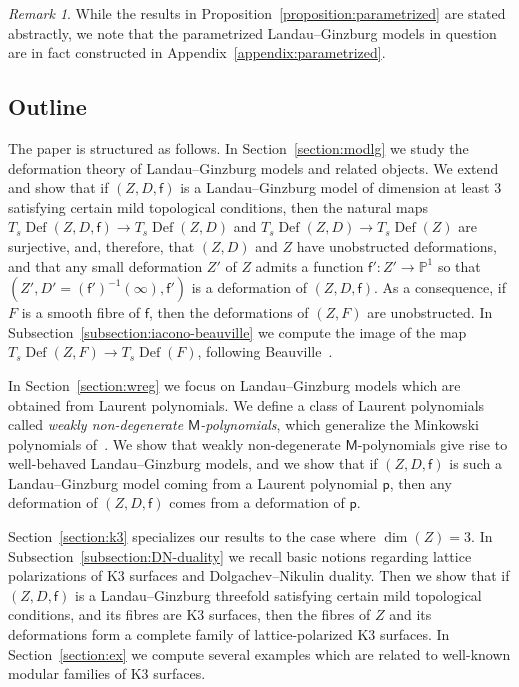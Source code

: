 \documentclass[10pt]{amsart}
\numberwithin{equation}{section}
\theoremstyle{plain}
\theoremstyle{definition}
\theoremstyle{remark}
\newtheorem{remark}[theorem]{Remark}
\DeclareMathOperator{\Def}{Def}
\begin{document}
\begin{remark}
    While the results in Proposition~\ref{proposition:parametrized} are stated abstractly, we note that the parametrized Landau--Ginzburg models in question are in fact constructed in Appendix~\ref{appendix:parametrized}.
\end{remark}

\subsection{Outline}

The paper is structured as follows. In Section~\ref{section:modlg} we study the deformation theory of Landau--Ginzburg models and related objects. We extend~\cite[Corollary 2.18]{katzarkov2017bogomolov} and show that if \((Z,D,\mathsf{f})\) is a Landau--Ginzburg model of dimension at least \(3\) satisfying certain mild topological conditions, then the natural maps \(T_s \Def(Z,D,\mathsf{f})\rightarrow T_s \Def(Z,D)\) and \(T_s \Def(Z,D) \rightarrow T_s \Def(Z)\) are surjective, and, therefore, that \((Z,D)\) and \(Z\) have unobstructed deformations, and that any small deformation  \(Z'\) of \(Z\) admits a function \(\mathsf{f}':Z'\rightarrow \mathbb{P}^1\) so that \((Z',D'= (\mathsf{f}')^{-1}(\infty), \mathsf{f}')\) is a deformation of \((Z,D,\mathsf{f})\).
As a consequence, if \(F\) is a smooth fibre of \(\mathsf{f}\), then the deformations of \((Z,F)\) are unobstructed.
In Subsection~\ref{subsection:iacono-beauville} we compute the image of the map \(T_s \Def(Z,F) \rightarrow T_s \Def(F)\), following Beauville~\cite{beauvillefano}.

In Section~\ref{section:wreg}  we focus on Landau--Ginzburg models which are obtained from Laurent polynomials. We define a class of Laurent polynomials called \emph{weakly non-degenerate \(\mathsf{M}\)-polynomials}, which generalize the Minkowski polynomials of~\cite{akhtar2012minkowski}. We show that weakly non-degenerate \(\mathsf{M}\)-polynomials give rise to well-behaved Landau--Ginzburg models, and we show that if \((Z,D,\mathsf{f})\) is such a Landau--Ginzburg model coming from a Laurent polynomial \(\mathsf{p}\), then any deformation of \((Z,D,\mathsf{f})\) comes from a deformation of \(\mathsf{p}\).

Section~\ref{section:k3} specializes our results to the case where \(\dim(Z) = 3\). In Subsection~\ref{subsection:DN-duality} we recall basic notions regarding lattice polarizations of K3 surfaces and Dolgachev--Nikulin duality. Then we show that if \((Z,D,\mathsf{f})\) is a Landau--Ginzburg threefold satisfying certain mild topological conditions, and its fibres are K3 surfaces, then the fibres of \(Z\) and its deformations form a complete family of lattice-polarized K3 surfaces. In Section~\ref{section:ex} we compute several examples which are related to well-known modular families of K3 surfaces.
\end{document}
